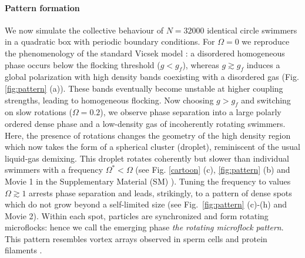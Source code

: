 \documentclass[aps,twocolumn,showlabels,showrefs,amsmath,amssymb,pre,superscriptaddress, floatfix, colors]{revtex4}
\newcommand{\1}{\begin{equation}}
\newcommand{\2}{\end{equation}}
\newcommand{\4}[2]{{\frac{#1}{#2}}}
\begin{document}
\paragraph*{Pattern formation}
We now simulate the collective behaviour of $N=32000$ identical circle swimmers in a quadratic box with periodic boundary conditions.
For $\Omega=0$ we reproduce the phenomenology of the standard Vicsek model \cite{VicsekRev, Chate2004, Mishra2010, Solon2015}: a disordered homogeneous phase occurs below the flocking threshold ($g<g_f$), 
whereas $g \gtrsim g_f$ induces a global polarization with high density bands coexisting with a disordered gas (Fig. \ref{fig:pattern} (a)). 
These bands eventually become unstable at higher coupling strengths, leading to homogeneous flocking. 
Now choosing $g>g_f$ and switching on slow rotations ($\Omega=0.2$),
we observe phase separation into a large polarly ordered dense phase and a low-density gas of incoherently rotating swimmers. 
Here, the presence of rotations changes the geometry of the high density region which now takes the form of a spherical cluster (droplet), reminiscent of the usual liquid-gas demixing.
This droplet rotates coherently but slower than individual swimmers with a frequency $\Omega^\ast< \Omega$ (see Fig. \ref{cartoon} (c), \ref{fig:pattern} (b) and Movie 1 in the Supplementary Material (SM) \cite{SM}). 
Tuning the frequency to values $\Omega \gtrsim 1$ arrests phase separation and leads, strikingly, to a pattern of dense spots which do not 
grow beyond a self-limited size (see Fig.~\ref{fig:pattern} (c)-(h) and Movie 2). 
Within each spot, particles are synchronized and form rotating microflocks: hence we call the emerging phase \emph{the rotating microflock pattern}.
This pattern resembles vortex arrays observed in sperm cells and protein filaments \cite{Riedel2005, Loose2013}. 
%
\end{document}
